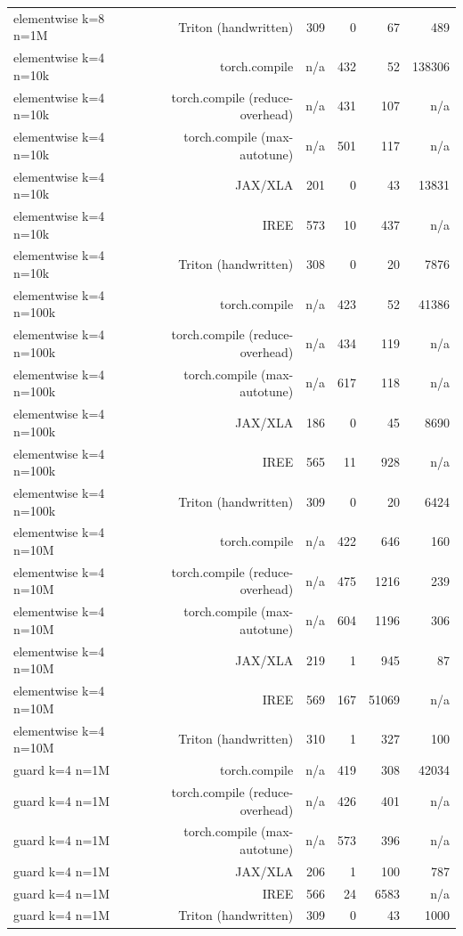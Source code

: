 \begin{tabular}{lrrrrr}
elementwise k=8 n=1M & Triton (handwritten) & 309 & 0 & 67 & 489 \\
elementwise k=4 n=10k & torch.compile & n/a & 432 & 52 & 138306 \\
elementwise k=4 n=10k & torch.compile (reduce-overhead) & n/a & 431 & 107 & n/a \\
elementwise k=4 n=10k & torch.compile (max-autotune) & n/a & 501 & 117 & n/a \\
elementwise k=4 n=10k & JAX/XLA & 201 & 0 & 43 & 13831 \\
elementwise k=4 n=10k & IREE & 573 & 10 & 437 & n/a \\
elementwise k=4 n=10k & Triton (handwritten) & 308 & 0 & 20 & 7876 \\
elementwise k=4 n=100k & torch.compile & n/a & 423 & 52 & 41386 \\
elementwise k=4 n=100k & torch.compile (reduce-overhead) & n/a & 434 & 119 & n/a \\
elementwise k=4 n=100k & torch.compile (max-autotune) & n/a & 617 & 118 & n/a \\
elementwise k=4 n=100k & JAX/XLA & 186 & 0 & 45 & 8690 \\
elementwise k=4 n=100k & IREE & 565 & 11 & 928 & n/a \\
elementwise k=4 n=100k & Triton (handwritten) & 309 & 0 & 20 & 6424 \\
elementwise k=4 n=10M & torch.compile & n/a & 422 & 646 & 160 \\
elementwise k=4 n=10M & torch.compile (reduce-overhead) & n/a & 475 & 1216 & 239 \\
elementwise k=4 n=10M & torch.compile (max-autotune) & n/a & 604 & 1196 & 306 \\
elementwise k=4 n=10M & JAX/XLA & 219 & 1 & 945 & 87 \\
elementwise k=4 n=10M & IREE & 569 & 167 & 51069 & n/a \\
elementwise k=4 n=10M & Triton (handwritten) & 310 & 1 & 327 & 100 \\
guard k=4 n=1M & torch.compile & n/a & 419 & 308 & 42034 \\
guard k=4 n=1M & torch.compile (reduce-overhead) & n/a & 426 & 401 & n/a \\
guard k=4 n=1M & torch.compile (max-autotune) & n/a & 573 & 396 & n/a \\
guard k=4 n=1M & JAX/XLA & 206 & 1 & 100 & 787 \\
guard k=4 n=1M & IREE & 566 & 24 & 6583 & n/a \\
guard k=4 n=1M & Triton (handwritten) & 309 & 0 & 43 & 1000 \\

\end{tabular}
